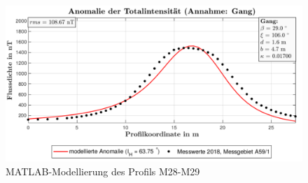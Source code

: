 \begin{figure}
 \centering
 \includegraphics[width=\textwidth]{fig/modM28}
 \caption{MATLAB-Modellierung des Profils M28-M29}
 \label{fig:modM28}
\end{figure}


